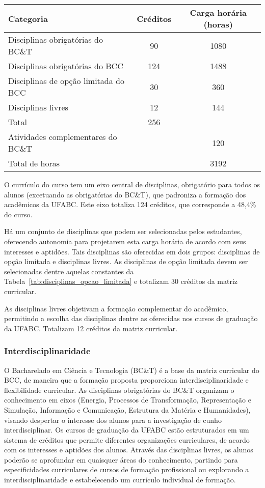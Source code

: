 \begin{center}
    \begin{tabular}{|l|c|c|}
        \hline
        Categoria & Créditos & Carga horária (horas)\\
        \hline\hline
        Disciplinas obrigatórias do BC\&T & 90 & 1080\\
        \hline
        Disciplinas obrigatórias do BCC & 124 & 1488 \\
        \hline
        Disciplinas de opção limitada do BCC & 30 & 360 \\
        \hline
        Disciplinas livres & 12 & 144\\
        \hline
        Total & 256 & \\
        \hline\hline
        Atividades complementares do BC\&T & & 120\\
        \hline
        Total de horas & & 3192\\
        \hline
    \end{tabular}
\end{center}


O currículo do curso tem um eixo central de disciplinas, obrigatório para todos
os alunos (excetuando as obrigatórias do BC\&T), que padroniza a formação dos
acadêmicos da UFABC. 
Este eixo totaliza 124 créditos, que corresponde a 48,4\% do curso.

Há um conjunto de disciplinas que podem ser selecionadas pelos estudantes,
oferecendo autonomia para projetarem esta carga horária de acordo com seus
interesses e aptidões.
Tais disciplinas são oferecidas em dois grupos: disciplinas de opção limitada e
disciplinas livres.
As disciplinas de opção limitada devem ser selecionadas dentre aquelas
constantes da Tabela~\ref{tab:disciplinas_opcao_limitada} e totalizam 30
créditos da matriz curricular.

As disciplinas livres objetivam a formação complementar do acadêmico,
permitindo a escolha das disciplinas dentre as oferecidas nos cursos de
graduação da UFABC.
Totalizam 12 créditos da matriz curricular.



\subsubsection{Interdisciplinaridade}

O Bacharelado em Ciência e Tecnologia (BC\&T) é a base da matriz curricular do
BCC, de maneira que a formação proposta proporciona interdisciplinaridade e
flexibilidade curricular.
As disciplinas obrigatórias do BC\&T organizam o conhecimento em eixos
(Energia, Processos de Transformação, Representação e Simulação, Informação e
Comunicação, Estrutura da Matéria e Humanidades), visando despertar o interesse
dos alunos para a investigação de cunho interdisciplinar.
Os cursos de graduação da UFABC estão estruturados em um sistema de créditos
que permite diferentes organizações curriculares, de acordo com os interesses e
aptidões dos alunos.
Através das disciplinas livres, os alunos poderão se aprofundar em quaisquer
áreas do conhecimento, partindo para especificidades curriculares de cursos de
formação profissional ou explorando a interdisciplinaridade e estabelecendo um
currículo individual de formação.

